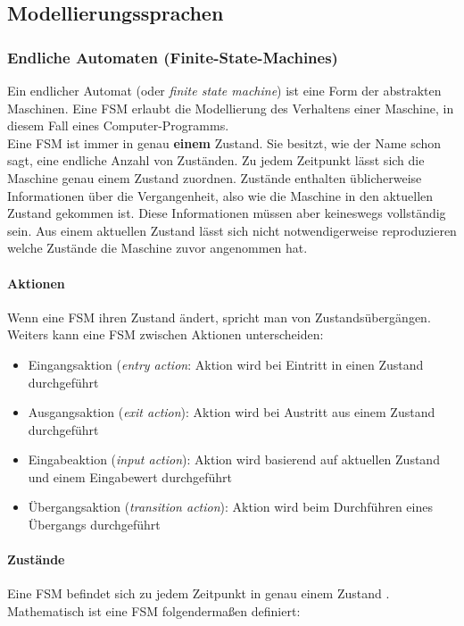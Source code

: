 \subsection{Modellierungssprachen}
\label{sec:notations}
\subsubsection{Endliche Automaten (Finite-State-Machines)}
\label{sec:fsm}
Ein endlicher Automat (oder \textit{finite state machine}) ist eine Form der abstrakten Maschinen. Eine FSM erlaubt die Modellierung des Verhaltens einer Maschine, in diesem Fall eines Computer-Programms.\cite{wagner_modeling_2006}\\
Eine FSM ist immer in genau \textbf{einem} Zustand. Sie besitzt, wie der Name schon sagt, eine endliche Anzahl von Zuständen. Zu jedem Zeitpunkt lässt sich die Maschine genau einem Zustand zuordnen. Zustände enthalten üblicherweise Informationen über die Vergangenheit, also wie die Maschine in den aktuellen Zustand gekommen ist. Diese Informationen müssen aber keineswegs vollständig sein. Aus einem aktuellen Zustand lässt sich nicht notwendigerweise reproduzieren welche Zustände die Maschine zuvor angenommen hat.\\

\paragraph{Aktionen}
Wenn eine FSM ihren Zustand ändert, spricht man von Zustandsübergängen. Weiters kann eine FSM zwischen Aktionen unterscheiden:
\begin{itemize}
\item Eingangsaktion (\textit{entry action}: Aktion wird bei Eintritt in einen Zustand durchgeführt
\item Ausgangsaktion (\textit{exit action}): Aktion wird bei Austritt aus einem Zustand durchgeführt
\item Eingabeaktion (\textit{input action}): Aktion wird basierend auf aktuellen Zustand und einem Eingabewert durchgeführt
\item Übergangsaktion (\textit{transition action}): Aktion wird beim Durchführen eines Übergangs durchgeführt
\end{itemize}

\paragraph{Zustände}
Eine FSM befindet sich zu jedem Zeitpunkt in genau einem Zustand . Mathematisch ist eine FSM folgendermaßen definiert: 

